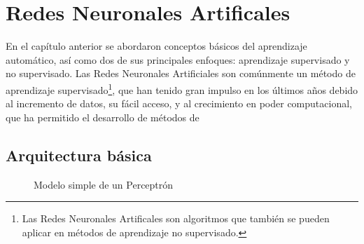 \chapter{Redes Neuronales Artificales}\label{ch:NNBasics}
En el capítulo anterior se abordaron conceptos básicos del aprendizaje automático, así como dos de sus principales enfoques: aprendizaje supervisado y no supervisado. Las Redes Neuronales Artificiales son comúnmente un método de aprendizaje supervisado\footnote{Las Redes Neuronales Artificales son algoritmos que también se pueden aplicar en métodos de aprendizaje no supervisado.}, que han tenido gran impulso en los últimos años debido al incremento de datos, su fácil acceso, y al crecimiento en poder computacional, que ha permitido el desarrollo de métodos de 





\section{Arquitectura básica}


\begin{figure}[hb]
  \centering

\caption{Modelo simple de un Perceptrón}
\label{fig:perceptron}
\end{figure}






